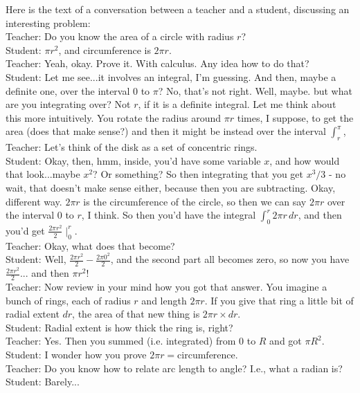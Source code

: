 Here is the text of a conversation between a teacher and a student, discussing an interesting problem:\\
Teacher: Do you know the area of a circle with radius $r$?\\
Student: $\pi r^2$, and circumference is $2\pi r$. \\
Teacher: Yeah, okay. Prove it. With calculus. Any idea how to do that?\\
Student: Let me see...it involves an integral, I'm guessing. And then, maybe a definite one, over the interval $0$ to $\pi$? No, that's not right. Well, maybe. but what are you integrating over? Not $r$, if it is a definite integral. Let me think about this more intuitively.
You rotate the radius around $\pi r$ times, I suppose, to get the area (does that make sense?) and then it might be instead over the interval $\int^{\pi}_r$,\\
Teacher: Let's think of the disk as a set of concentric rings.\\
Student: Okay, then, hmm, inside, you'd have some variable $x$, and how would that look...maybe $x^2$? Or something?
So then integrating that you get $x^3/3$ - 
no wait, that doesn't make sense either, because then you are subtracting.
Okay, different way.
$2\pi r$ is the circumference of the circle,
so then we can say $2\pi r$ over the interval $0$ to $r$,  I think.
So then you'd have the integral $\int^r_0 2\pi r \, dr$,
and then you'd get $\frac{2\pi r^2}{2}\mid^r_0$.\\
Teacher: Okay, what does that become?\\
Student: Well, $\frac{2\pi r^2}{2}-\frac{2\pi 0^2}{2}$, and
the second part all becomes zero, so now you have $\frac{2\pi r^2}{2}$...
and then $\pi r^2$!\\
Teacher: Now review in your mind how you got that answer. You imagine a bunch of rings, each of radius $r$ and length $2 \pi r$.
If you give that ring a little bit of radial extent $dr$, the area of that new thing is $2 \pi r \times dr$.\\
Student: Radial extent is how thick the ring is, right?\\
Teacher: Yes. Then you summed (i.e. integrated) from 0 to $R$ and got $\pi R^2$.\\
Student: I wonder how you prove $2\pi r = \text{circumference}$.\\
Teacher: Do you know how to relate arc length to angle?
I.e., what a radian is?\\
Student: Barely...\\
